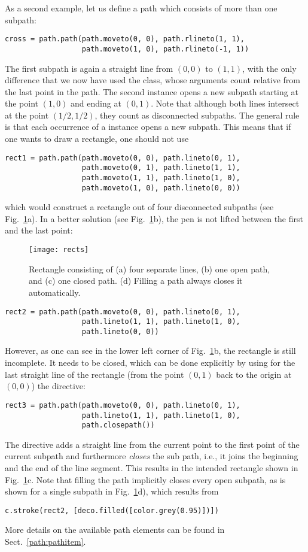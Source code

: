 As a second example, let us define a path which consists of more than 
one subpath:
\begin{verbatim}
cross = path.path(path.moveto(0, 0), path.rlineto(1, 1),
                  path.moveto(1, 0), path.rlineto(-1, 1))
\end{verbatim}
The first subpath is again a straight line from $(0, 0)$ to $(1, 1)$,
with the only difference that we now have used the 
class, whose arguments count relative from the last point in the path.
The second  instance opens a new subpath starting at the
point $(1, 0)$ and ending at $(0, 1)$. Note that although both lines
intersect at the point $(1/2, 1/2)$, they count as disconnected
subpaths.  The general rule is that each occurrence of a 
instance opens a new subpath. This means that if one wants to draw a
rectangle, one should not use
\begin{verbatim}
rect1 = path.path(path.moveto(0, 0), path.lineto(0, 1),
                  path.moveto(0, 1), path.lineto(1, 1),
                  path.moveto(1, 1), path.lineto(1, 0),
                  path.moveto(1, 0), path.lineto(0, 0))
\end{verbatim}
which would construct a rectangle out of four disconnected
subpaths (see Fig.~\ref{fig:rects}a). In a better solution (see
Fig.~\ref{fig:rects}b), the pen is not lifted between the first and
the last point:
%
\begin{figure}
\centerline{\texttt{[image: rects]}}
\caption{Rectangle consisting of (a) four separate lines, (b) one open
  path, and (c) one closed path. (d) Filling a
  path always closes it automatically.}
\label{fig:rects}
\end{figure}
%
\begin{verbatim}
rect2 = path.path(path.moveto(0, 0), path.lineto(0, 1), 
                  path.lineto(1, 1), path.lineto(1, 0),
                  path.lineto(0, 0))
\end{verbatim}
However, as one can see in the lower left corner of
Fig.~\ref{fig:rects}b, the rectangle is still incomplete.  It needs to
be closed, which can  be done explicitly by using for the last straight
line of the rectangle (from the point $(0, 1)$ back to the origin at $(0, 0)$)
the  directive:
\begin{verbatim}
rect3 = path.path(path.moveto(0, 0), path.lineto(0, 1), 
                  path.lineto(1, 1), path.lineto(1, 0),
                  path.closepath())
\end{verbatim}
The  directive adds a straight line from the current
point to the first point of the current subpath and furthermore
\textit{closes} the sub path, i.e., it joins the beginning and the end
of the line segment. This results in the intended rectangle shown in
Fig.~\ref{fig:rects}c. Note that filling the path implicitly closes
every open subpath, as is shown for a single subpath in
Fig.~\ref{fig:rects}d), which results from
\begin{verbatim}
c.stroke(rect2, [deco.filled([color.grey(0.95)])])
\end{verbatim}
More details on the available path elements can be found in
Sect.~\ref{path:pathitem}.

